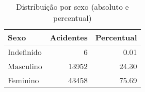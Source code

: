 \begin{table}
\caption{Distribuição por sexo (absoluto e percentual)}
\begin{tabular}{lrr}
\toprule
Sexo & Acidentes & Percentual \\
\midrule
Indefinido & 6 & 0.01 \\
Masculino & 13952 & 24.30 \\
Feminino & 43458 & 75.69 \\
\bottomrule
\end{tabular}
\end{table}
